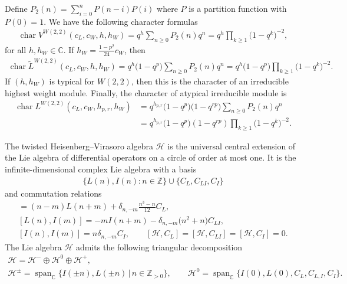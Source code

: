 \documentclass[pdftex]{sigma}
\numberwithin{equation}{section}
\newcommand{\Z}{\mathbb Z}
\newcommand{\C}{\mathbb C}
\newcommand{\HVir}{\mathcal H}
\DeclareMathOperator{\ch}{char}
\begin{document}
Def\/ine $P_{2}(n) =\sum\limits_{i=0}^{n}P(n-i)P(i)$ where $P $ is a partition function with $P(0)=1$. We have the following character
formulas~\cite{R-JMP}
\begin{gather*}
\ch V^{W(2,2)}( c_{L},c_{W},h,h_{W}) =q^{h}\sum_{n\geq0}P_{2}(n)q^{n}=q^{h}\prod\limits_{k\geq1}\big(1-q^{k}\big)^{-2},
\end{gather*}
for all $h,h_W \in \C$. If $h_W = \frac{1-p^2}{24}c_W$, then
\begin{gather*}
\ch \widetilde{L}^{W(2,2)}(c_{L},c_{W},h,h_{W}) =q^{h}\big(1-q^{p}\big)\sum_{n\geq0}P_{2}(n)q^{n}
 =q^{h}\big(1-q^{p}\big)\prod\limits_{k\geq1}\big(1-q^{k}\big)^{-2}.
\end{gather*}
If $(h,h_W)$ is typical for $W(2,2)$, then this is the character of an irreducible highest weight module. Finally, the character of atypical irreducible module is
\begin{align*}
\ch L^{W(2,2)}( c_{L},c_{W},h_{p,r},h_{W})& =q^{h_{p,r}}\big(1-q^{p}\big)\big(1-q^{rp}\big)\sum_{n\geq0}P_{2}(n)q^{n} \\
& =q^{h_{p,r}}\big(1-q^{p}\big)(1-q^{rp})\prod\limits_{k\geq1}\big(1-q^{k}\big)^{-2}.
\end{align*}

The twisted Heisenberg--Virasoro algebra $\HVir$ is the universal central extension of the Lie algebra of dif\/ferential operators on a circle of order at most one. It is the inf\/inite-dimensional complex Lie algebra with a basis
\begin{gather*}
\{L(n),I(n)\colon n\in\Z\}\cup\{C_{L},C_{LI},C_{I}\}
\end{gather*}
and commutation relations
\begin{gather*}
[ L(n),L(m)] =(n-m)L(n+m)+\delta_{n,-m}\frac{n^{3}-n}{12}C_{L},\\
[ L(n),I(m)] =-mI(n+m)-\delta_{n,-m}\big(n^{2}+n\big)C_{LI}, \\
[ I(n),I(m)] =n\delta_{n,-m}C_{I}, \qquad
[ {\HVir},C_{L}] =[ {\HVir},C_{LI}] =[ \HVir,C_{I}] =0.
\end{gather*}
The Lie algebra $\HVir$ admits the following triangular decomposition
\begin{gather}
\HVir =\HVir ^{-} \oplus \HVir^0 \oplus \HVir^{+}, \label{triangular} \\
\HVir ^{\pm} = \operatorname{span}_{\mathbb C} \{ I( \pm n), L(\pm n) \,|\, n \in {\Z}_{>0}\}, \qquad
\HVir^0 = \operatorname{span}_{\mathbb C} \{ I(0), L(0), C_L, C_{L,I}, C_{I} \}. \nonumber
\end{gather}
\end{document}
